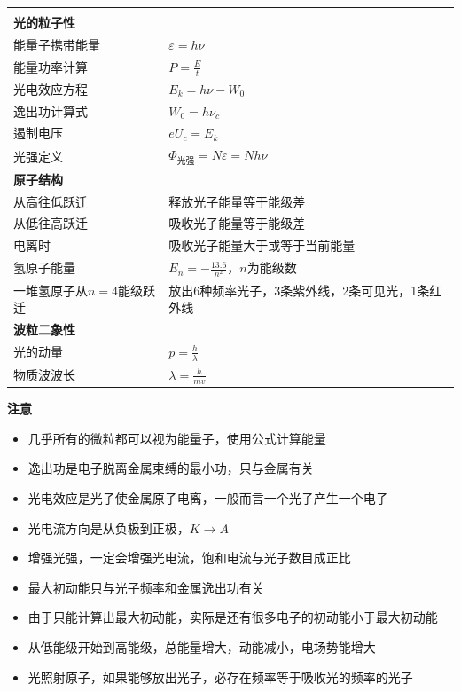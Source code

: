 \documentclass{cheatsheet}
\begin{document}
\begin{tabularx}{\columnwidth}{XX}
	\rowcolor{blue!30}
	\multicolumn{2}{l}{\parbox[c][2.5\ht\strutbox][c]{0.9\columnwidth}{\Large 原子与波粒二象性}} \\
	\multicolumn{2}{l}{\textbf{光的粒子性}}\\
	能量子携带能量 & $\varepsilon = h\nu$ \\
	能量功率计算 & $P=\frac{E}{t}$ \\
	光电效应方程  & $E_k=h\nu-W_0$ \\
	逸出功计算式  & $W_0=h\nu_c$ \\
	遏制电压    & $eU_c=E_k$  \\
	光强定义    & $\Phi_{\text{光强}} = N\varepsilon = Nh\nu$ \\
	\multicolumn{2}{l}{\textbf{原子结构}}\\
	从高往低跃迁 & 释放光子能量等于能级差\\
	从低往高跃迁 & 吸收光子能量等于能级差\\
	电离时 & 吸收光子能量大于或等于当前能量\\
	氢原子能量 & $E_n=-\frac{13.6}{n^2}$，$n$为能级数\\
	一堆氢原子从$n=4$能级跃迁 & 放出6种频率光子，3条紫外线，2条可见光，1条红外线\\
	\multicolumn{2}{l}{\textbf{波粒二象性}}\\
	光的动量   & $p=\frac{h}{\lambda}$ \\
	物质波波长 & $\lambda=\frac{h}{mv}$ \\
\end{tabularx}
\textbf{注意}
\begin{itemize}
	\item 几乎所有的微粒都可以视为能量子，使用公式计算能量
	\item 逸出功是电子脱离金属束缚的最小功，只与金属有关
	\item 光电效应是光子使金属原子电离，一般而言一个光子产生一个电子
	\item 光电流方向是从负极到正极，$K\to A$
	\item 增强光强，一定会增强光电流，饱和电流与光子数目成正比
	\item 最大初动能只与光子频率和金属逸出功有关
	\item 由于只能计算出最大初动能，实际是还有很多电子的初动能小于最大初动能
	\item 从低能级开始到高能级，总能量增大，动能减小，电场势能增大
	\item 光照射原子，如果能够放出光子，必存在频率等于吸收光的频率的光子
\end{itemize}
\end{document}
